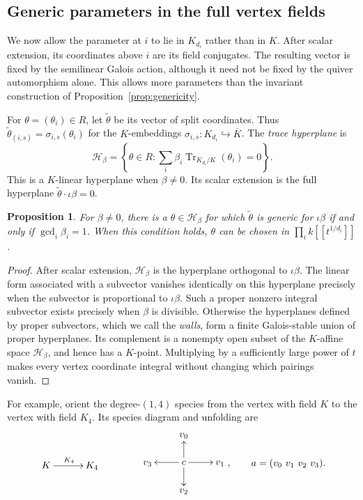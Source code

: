 \documentclass[11pt, reqno]{amsart}
\numberwithin{equation}{section}
\newtheorem{proposition}[theorem]{Proposition}
\theoremstyle{definition}
\theoremstyle{remark}
\newcommand{\op}[1]{\operatorname{#1}}
\newcommand{\mc}[1]{\mathcal{#1}}
\newcommand{\Tr}{\op{Tr}}
\newcommand{\Kbar}{\overline K}
\newcommand{\quiverdiagram}[1]{\vcenter{\hbox{$\displaystyle #1$}}}
\begin{document}
\subsection{Generic parameters in the full vertex fields}
\label{subsec:full-parameters}

We now allow the parameter at $i$ to lie in $K_{d_i}$ rather than in
$K$. After scalar extension, its coordinates above $i$ are its field
conjugates. The resulting vector is fixed by the semilinear Galois
action, although it need not be fixed by the quiver automorphism alone.
This allows more parameters than the invariant construction of
Proposition~\ref{prop:genericity}.

For $\theta=(\theta_i)\in R$, let $\widetilde\theta$ be its vector of
split coordinates. Thus
$\widetilde\theta_{(i,s)}=\sigma_{i,s}(\theta_i)$ for the $K$-embeddings
$\sigma_{i,s}:K_{d_i}\hookrightarrow\Kbar$. The \emph{trace hyperplane} is
\[ \mc H_\beta=\left\{\theta\in R: \sum_i\beta_i\Tr_{K_{d_i}/K}(\theta_i)=0\right\}. \]
This is a $K$-linear hyperplane when $\beta\ne0$. Its scalar extension
is the full hyperplane $\widetilde\theta\cdot\iota\beta=0$.

\begin{proposition}\label{prop:full-generic}
For $\beta\ne0$, there is a $\theta\in \mc H_\beta$ for which
$\widetilde\theta$ is generic for $\iota\beta$ if and only if
$\gcd_i\beta_i=1$. When this condition holds, $\theta$ can be chosen
in $\prod_i k[[t^{1/d_i}]]$.
\end{proposition}
\begin{proof}
After scalar extension, $\mc H_\beta$ is the hyperplane orthogonal
to $\iota\beta$. The linear form associated with a subvector vanishes identically on
this hyperplane precisely when the subvector is proportional to
$\iota\beta$. Such a proper nonzero integral subvector exists
precisely when $\beta$ is divisible.
Otherwise the hyperplanes defined by proper subvectors, which we
call the \emph{walls}, form a finite Galois-stable union of proper
hyperplanes. Its complement is a nonempty open subset of the
$K$-affine space $\mc H_\beta$, and hence has a $K$-point.
Multiplying by a sufficiently large power of $t$ makes every vertex
coordinate integral without changing which pairings vanish.
\end{proof}

For example, orient the degree-$(1,4)$ species from the vertex with
field $K$ to the vertex with field $K_4$. Its species diagram and
unfolding are
\begin{equation} \label{eq:1,4}
\quiverdiagram{\xymatrix@C=3em{K\ar[r]^{K_4}&K_4}}
\qquad\qquad
\quiverdiagram{\xymatrix@C=2.2em@R=1.7em{
 &v_0&\\
 v_3&c\ar[u]\ar[r]\ar[d]\ar[l]&v_1\\
 &v_2&
}},\qquad a=(v_0\ v_1\ v_2\ v_3).
\end{equation}
\end{document}
